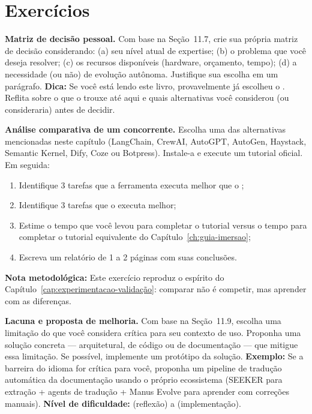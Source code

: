 \section{Exercícios}
\label{sec:exercicios-comparacao}
\begin{exercicio}
\textbf{Matriz de decisão pessoal.} Com base na Seção~11.7, crie sua
própria matriz de decisão considerando: (a) seu nível atual de expertise;
(b) o problema que você deseja resolver; (c) os recursos disponíveis
(hardware, orçamento, tempo); (d) a necessidade (ou não) de evolução
autônoma. Justifique sua escolha em um parágrafo.
\textbf{Dica:} Se você está lendo este livro, provavelmente já escolheu o
\opencodeeco{}. Reflita sobre o que o trouxe até aqui e quais alternativas
você considerou (ou consideraria) antes de decidir.
\end{exercicio}
\begin{exercicio}
\textbf{Análise comparativa de um concorrente.} Escolha uma das alternativas
mencionadas neste capítulo (LangChain, CrewAI, AutoGPT, AutoGen, Haystack,
Semantic Kernel, Dify, Coze ou Botpress). Instale-a e execute um tutorial
oficial. Em seguida:
\begin{enumerate}
\item Identifique 3 tarefas que a ferramenta executa melhor que o
\opencodeeco{};
\item Identifique 3 tarefas que o \opencodeeco{} executa melhor;
\item Estime o tempo que você levou para completar o tutorial versus
o tempo para completar o tutorial equivalente do
Capítulo~\ref{ch:guia-imersao};
\item Escreva um relatório de 1 a 2 páginas com suas conclusões.
\end{enumerate}
\textbf{Nota metodológica:} Este exercício reproduz o espírito do
Capítulo~\ref{cap:experimentacao-validação}: comparar não é competir, mas
aprender com as diferenças.
\end{exercicio}
\begin{exercicio}
\textbf{Lacuna e proposta de melhoria.} Com base na Seção~11.9, escolha uma
limitação do \opencodeeco{} que você considera crítica para seu contexto
de uso. Proponha uma solução concreta --- arquitetural, de código ou de
documentação --- que mitigue essa limitação. Se possível, implemente um
protótipo da solução.
\textbf{Exemplo:} Se a barreira do idioma for crítica para você, proponha
um pipeline de tradução automática da documentação usando o próprio
ecossistema (SEEKER para extração + agents de tradução + Manus Evolve para
aprender com correções manuais).
\textbf{Nível de dificuldade:} \nivelavancado{} (reflexão) a
\nivelphd{} (implementação).
\end{exercicio}

